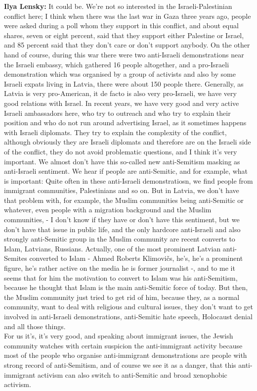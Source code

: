 \textbf{Ilya Lensky:} It could be. We’re not so interested in the Israeli-Palestinian conflict here; I think when there was the last war in Gaza three years ago, people were asked during a poll whom they support in this conflict, and about equal shares, seven or eight percent, said that they support either Palestine or Israel, and 85 percent said that they don’t care or don’t support anybody. On the other hand of course, during this war there were two anti-Israeli demonstrations near the Israeli embassy, which gathered 16 people altogether, 
and a pro-Israeli demonstration which was organised by a group of activists and also by some Israeli expats living in Latvia, there were about 150 people there. Generally, as Latvia is very pro-American, it de facto is also very pro-Israeli, we have very good relations with Israel. In recent years, we have very good and very active Israeli ambassadors here, who try to outreach and who try to explain their position and who do not run around advertising Israel, as it sometimes happens with Israeli diplomats. They try to explain the complexity of the conflict, although obviously they are Israeli diplomats and therefore are on the Israeli side of the conflict, they do not avoid problematic questions, and I think it's very important. We almost don’t have this so-called new anti-Semitism masking as anti-Israeli sentiment. We hear if people are anti-Semitic, and for example, what is important: Quite often in these anti-Israeli demonstratiosn, we find people from immigrant communities, Palestinians and so on. But in Latvia, we don’t have that problem with, for example, the Muslim communities being anti-Semitic or whatever, even people with a migration background and the Muslim communities, - I don’t know if they have or don’t have this sentiment, but we don’t have that issue in public life, and the only hardcore anti-Israeli and also strongly anti-Semitic group in the Muslim community are recent converts to Islam, Latvians, Russians. Actually, one of the most prominent Latvian anti-Semites converted to Islam - Ahmed Roberts Klimovičs, he’s, he’s a prominent figure, he’s rather active on the media he is former journalist -, and to me it seems that for him the motivation to convert to Islam was his anti-Semitism, because he thought that Islam is the main anti-Semitic force of today. But then, the Muslim community just tried to get rid of him, because they, as a normal community, want to deal with religious and cultural issues, they don’t want to get involved in anti-Israeli demonstrations, anti-Semitic hate speech, Holocaust denial and all those things. \\
For us it’s, it’s very good, and speaking about immigrant issues, the Jewish community watches with certain suspicion the anti-immigrant activity because most of the people who organise anti-immigrant demonstrations are people with strong record of anti-Semitism, and of course we see it as a danger, that this anti-immigrant activism can also switch to anti-Semitic and broad xenophobic activism. 

